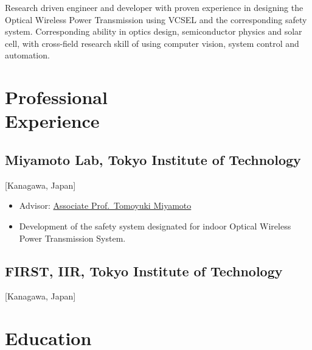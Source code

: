 \documentclass{mycv}
\begin{document}
\maketitle%

\begin{summary}
Research driven engineer and developer with proven experience in designing the Optical Wireless Power Transmission using VCSEL and the corresponding safety system. Corresponding ability in optics design, semiconductor physics and solar cell, with cross-field research skill of using computer vision, system control and automation.
\end{summary}

\section{Professional \\ Experience}

\subsection{Miyamoto Lab, Tokyo Institute of Technology}[Kanagawa, Japan]
\begin{positions}
\end{positions}
\begin{itemize}
	\item Advisor: \href{https://www.first.iir.titech.ac.jp/member/core3.html#miyamoto}{Associate Prof.~Tomoyuki Miyamoto}
	\item Development of the safety system designated for indoor Optical Wireless Power Transmission System.
\end{itemize}

\subsection{FIRST, IIR, Tokyo Institute of Technology}[Kanagawa, Japan]
\begin{positions}
\end{positions}



\section{Education}
\end{document}
